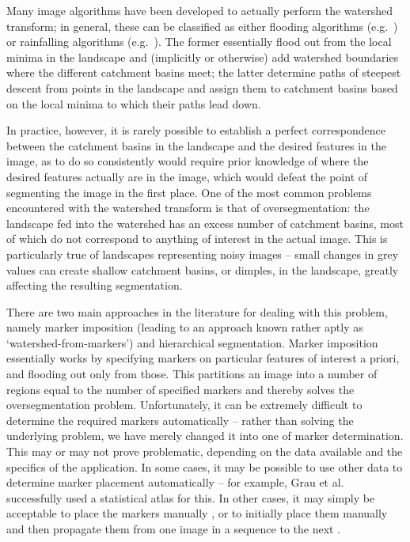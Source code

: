 Many image algorithms have been developed to actually perform the watershed transform; in general, these can be classified as either flooding algorithms (e.g.~\cite{bieniek00,rambabu07}) or rainfalling algorithms (e.g.~\cite{meijster98,osma-ruiz06,stoev00}). The former essentially flood out from the local minima in the landscape and (implicitly or otherwise) add watershed boundaries where the different catchment basins meet; the latter determine paths of steepest descent from points in the landscape and assign them to catchment basins based on the local minima to which their paths lead down.

In practice, however, it is rarely possible to establish a perfect correspondence between the catchment basins in the landscape and the desired features in the image, as to do so consistently would require prior knowledge of where the desired features actually are in the image, which would defeat the point of segmenting the image in the first place. One of the most common problems encountered with the watershed transform is that of oversegmentation: the landscape fed into the watershed has an excess number of catchment basins, most of which do not correspond to anything of interest in the actual image. This is particularly true of landscapes representing noisy images -- small changes in grey values can create shallow catchment basins, or dimples, in the landscape, greatly affecting the resulting segmentation.

There are two main approaches in the literature for dealing with this problem, namely marker imposition (leading to an approach known rather aptly as `watershed-from-markers') and hierarchical segmentation. Marker imposition essentially works by specifying markers on particular features of interest a priori, and flooding out only from those. This partitions an image into a number of regions equal to the number of specified markers and thereby solves the oversegmentation problem. Unfortunately, it can be extremely difficult to determine the required markers automatically -- rather than solving the underlying problem, we have merely changed it into one of marker determination. This may or may not prove problematic, depending on the data available and the specifics of the application. In some cases, it may be possible to use other data to determine marker placement automatically -- for example, Grau et al.\ \cite{grau04} successfully used a statistical atlas for this. In other cases, it may simply be acceptable to place the markers manually \cite{xue05}, or to initially place them manually and then propagate them from one image in a sequence to the next \cite{flores09}.

